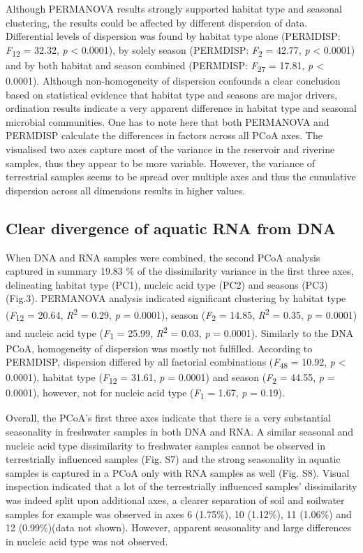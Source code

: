 \documentclass[12pt,a4paper]{article} %
\begin{document}
Although PERMANOVA results strongly supported habitat type and seasonal clustering, the results could be affected by different dispersion of data. Differential levels of dispersion was found by habitat type alone (PERMDISP: \textit{F}\textsubscript{12} = 32.32, \textit{p} < 0.0001), by solely season (PERMDISP: \textit{F}\textsubscript{2} = 42.77, \textit{p} < 0.0001) and by both habitat and season combined (PERMDISP: \textit{F}\textsubscript{27} = 17.81, \textit{p} < 0.0001). Although non-homogeneity of dispersion confounds a clear conclusion based on statistical evidence that habitat type and seasons are major drivers, ordination results indicate a very apparent difference in habitat type and seasonal microbial communities. One has to note here that both PERMANOVA and PERMDISP calculate the differences in factors across all PCoA axes. The visualised two axes capture most of the variance in the reservoir and riverine samples, thus they appear to be more variable. However, the variance of terrestrial samples seems to be spread over multiple axes and thus the cumulative dispersion across all dimensions results in higher values.

\subsection*{Clear divergence of aquatic RNA from DNA}
When DNA and RNA samples were combined, the second PCoA analysis captured in summary 19.83 \% of the dissimilarity variance in the first three axes, delineating habitat type (PC1), nucleic acid type (PC2) and seasons (PC3)(Fig.3). PERMANOVA analysis indicated significant clustering by habitat type (\textit{F}\textsubscript{12} = 20.64, \textit{R}\textsuperscript{2} = 0.29, \textit{p} = 0.0001), season (\textit{F}\textsubscript{2} = 14.85, \textit{R}\textsuperscript{2} = 0.35, \textit{p} = 0.0001) and nucleic acid type (\textit{F}\textsubscript{1} = 25.99, \textit{R}\textsuperscript{2} = 0.03, \textit{p} = 0.0001). Similarly to the DNA PCoA, homogeneity of dispersion was mostly not fulfilled. According to PERMDISP, dispersion differed by all factorial combinations (\textit{F}\textsubscript{48} = 10.92, \textit{p} < 0.0001), habitat type (\textit{F}\textsubscript{12} = 31.61, \textit{p} = 0.0001) and season (\textit{F}\textsubscript{2} = 44.55, \textit{p} = 0.0001), however, not for nucleic acid type (\textit{F}\textsubscript{1} = 1.67, \textit{p} = 0.19).

Overall, the PCoA's first three axes indicate that there is a very substantial seasonality in freshwater samples in both DNA and RNA. A similar seasonal and nucleic acid type dissimilarity to freshwater samples cannot be observed in terrestrially influenced samples (Fig. S7) and the strong seasonality in aquatic samples is captured in a PCoA only with RNA samples as well (Fig. S8). Visual inspection indicated that a lot of the terrestrially influenced samples' dissimilarity was indeed split upon additional axes, a clearer separation of soil and soilwater samples for example was observed in axes 6 (1.75\%), 10 (1.12\%), 11 (1.06\%) and 12 (0.99\%)(data not shown). However, apparent seasonality and large differences in nucleic acid type was not observed.
\end{document}
